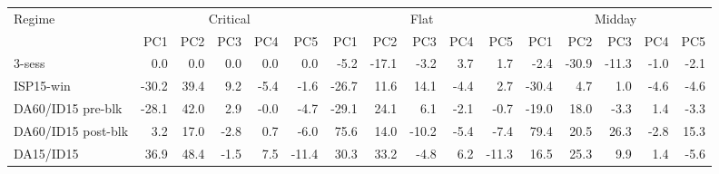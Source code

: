 \begin{tabular}{l r r r r r r r r r r r r r r r}
\toprule
Regime & \multicolumn{5}{c}{Critical} & \multicolumn{5}{c}{Flat} & \multicolumn{5}{c}{Midday} \\
\cmidrule(lr){2-6}\cmidrule(lr){7-11}\cmidrule(lr){12-16}
 & PC1 & PC2 & PC3 & PC4 & PC5 & PC1 & PC2 & PC3 & PC4 & PC5 & PC1 & PC2 & PC3 & PC4 & PC5 \\
\midrule
3-sess & 0.0 & 0.0 & 0.0 & 0.0 & 0.0 & -5.2 & -17.1 & -3.2 & 3.7 & 1.7 & -2.4 & -30.9 & -11.3 & -1.0 & -2.1 \\
ISP15-win & -30.2 & 39.4 & 9.2 & -5.4 & -1.6 & -26.7 & 11.6 & 14.1 & -4.4 & 2.7 & -30.4 & 4.7 & 1.0 & -4.6 & -4.6 \\
DA60/ID15 pre-blk & -28.1 & 42.0 & 2.9 & -0.0 & -4.7 & -29.1 & 24.1 & 6.1 & -2.1 & -0.7 & -19.0 & 18.0 & -3.3 & 1.4 & -3.3 \\
DA60/ID15 post-blk & 3.2 & 17.0 & -2.8 & 0.7 & -6.0 & 75.6 & 14.0 & -10.2 & -5.4 & -7.4 & 79.4 & 20.5 & 26.3 & -2.8 & 15.3 \\
DA15/ID15 & 36.9 & 48.4 & -1.5 & 7.5 & -11.4 & 30.3 & 33.2 & -4.8 & 6.2 & -11.3 & 16.5 & 25.3 & 9.9 & 1.4 & -5.6 \\
\bottomrule
\end{tabular}